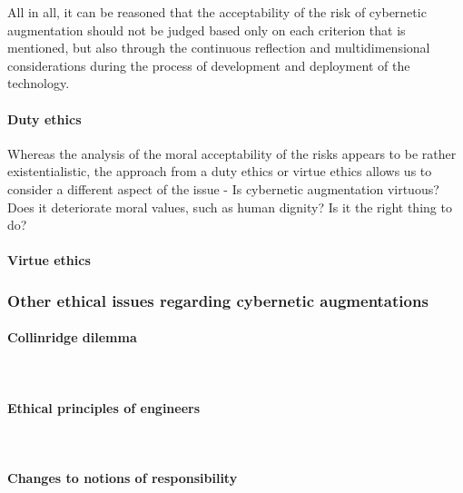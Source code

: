 All in all, it can be reasoned that the acceptability of the risk of cybernetic augmentation should not be judged based only on each criterion that is mentioned, but also through the continuous reflection and multidimensional considerations during the process of development and deployment of the technology.

\paragraph{Duty ethics}

Whereas the analysis of the moral acceptability of the risks appears to be rather existentialistic, the approach from a duty ethics or virtue ethics allows us to consider a different aspect of the issue - Is cybernetic augmentation virtuous? Does it deteriorate moral values, such as human dignity? Is it the right thing to do? 

\paragraph{Virtue ethics}



\subsubsection{Other ethical issues regarding cybernetic augmentations}

\paragraph{Collinridge dilemma} \\

\paragraph{Ethical principles of engineers} \\

\paragraph{Changes to notions of responsibility} \\




